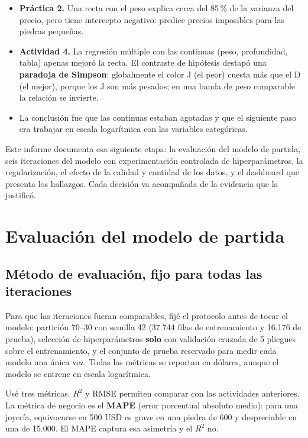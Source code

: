 \documentclass[12pt,letterpaper]{article}
\begin{document}
\begin{itemize}[leftmargin=1.2cm,itemsep=0.2em]
\item \textbf{Práctica 2.} Una recta con el peso explica cerca del 85\,\% de la
varianza del precio, pero tiene intercepto negativo: predice precios imposibles
para las piedras pequeñas.
\item \textbf{Actividad 4.} La regresión múltiple con las continuas (peso,
profundidad, tabla) apenas mejoró la recta. El contraste de hipótesis destapó una
\textbf{paradoja de Simpson}: globalmente el color J (el peor) cuesta más que el
D (el mejor), porque los J son más pesados; en una banda de peso comparable la
relación se invierte.
\item La conclusión fue que las continuas estaban agotadas y que el siguiente
paso era trabajar en escala logarítmica con las variables categóricas.
\end{itemize}

Este informe documenta esa siguiente etapa: la evaluación del modelo de partida,
seis iteraciones del modelo con experimentación controlada de hiperparámetros,
la regularización, el efecto de la calidad y cantidad de los datos, y el
dashboard que presenta los hallazgos. Cada decisión va acompañada de la evidencia
que la justificó.

\section{Evaluación del modelo de partida}

\subsection{Método de evaluación, fijo para todas las iteraciones}

Para que las iteraciones fueran comparables, fijé el protocolo antes de tocar el
modelo: partición 70--30 con semilla 42 (37.744 filas de entrenamiento y 16.176
de prueba), selección de hiperparámetros \textbf{solo} con validación cruzada de 5
pliegues sobre el entrenamiento, y el conjunto de prueba reservado para medir cada
modelo una única vez. Todas las métricas se reportan en dólares, aunque el modelo
se entrene en escala logarítmica.

Usé tres métricas. $R^2$ y RMSE permiten comparar con las actividades
anteriores. La métrica de negocio es el \textbf{MAPE} (error porcentual absoluto
medio): para una joyería, equivocarse en 500 USD es grave en una piedra de 600 y
despreciable en una de 15.000. El MAPE captura esa asimetría y el $R^2$ no.
\end{document}
